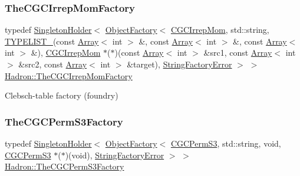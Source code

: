 \subsubsection{\texorpdfstring{TheCGCIrrepMomFactory}{TheCGCIrrepMomFactory}}
{\footnotesize\ttfamily typedef \mbox{\hyperlink{classUtil_1_1SingletonHolder}{Singleton\+Holder}}$<$ \mbox{\hyperlink{classUtil_1_1ObjectFactory}{Object\+Factory}}$<$ \mbox{\hyperlink{classHadron_1_1CGCIrrepMom}{C\+G\+C\+Irrep\+Mom}}, std\+::string, \mbox{\hyperlink{adat__devel__install_2include_2adat_2typelist_8h_a0309f68a543c5c0994f9edc0e56dc59f}{T\+Y\+P\+E\+L\+I\+S\+T\+\_}}(const \mbox{\hyperlink{classXMLArray_1_1Array}{Array}}$<$ int $>$ \&, const \mbox{\hyperlink{classXMLArray_1_1Array}{Array}}$<$ int $>$ \&, const \mbox{\hyperlink{classXMLArray_1_1Array}{Array}}$<$ int $>$ \&), \mbox{\hyperlink{classHadron_1_1CGCIrrepMom}{C\+G\+C\+Irrep\+Mom}} $\ast$($\ast$)(const \mbox{\hyperlink{classXMLArray_1_1Array}{Array}}$<$ int $>$ \&src1, const \mbox{\hyperlink{classXMLArray_1_1Array}{Array}}$<$ int $>$ \&src2, const \mbox{\hyperlink{classXMLArray_1_1Array}{Array}}$<$ int $>$ \&target), \mbox{\hyperlink{structUtil_1_1StringFactoryError}{String\+Factory\+Error}} $>$ $>$ \mbox{\hyperlink{namespaceHadron_a4657a351a06d86fb997a0765f97e3f13}{Hadron\+::\+The\+C\+G\+C\+Irrep\+Mom\+Factory}}}



Clebsch-\/table factory (foundry) 

\mbox{\label{namespaceHadron_a5dba98c73cf8d3f64496a084c7e3d16c}} 
\subsubsection{\texorpdfstring{TheCGCPermS3Factory}{TheCGCPermS3Factory}}
{\footnotesize\ttfamily typedef \mbox{\hyperlink{classUtil_1_1SingletonHolder}{Singleton\+Holder}}$<$ \mbox{\hyperlink{classUtil_1_1ObjectFactory}{Object\+Factory}}$<$ \mbox{\hyperlink{classHadron_1_1CGCPermS3}{C\+G\+C\+Perm\+S3}}, std\+::string, void, \mbox{\hyperlink{classHadron_1_1CGCPermS3}{C\+G\+C\+Perm\+S3}} $\ast$($\ast$)(void), \mbox{\hyperlink{structUtil_1_1StringFactoryError}{String\+Factory\+Error}} $>$ $>$ \mbox{\hyperlink{namespaceHadron_a5dba98c73cf8d3f64496a084c7e3d16c}{Hadron\+::\+The\+C\+G\+C\+Perm\+S3\+Factory}}}



